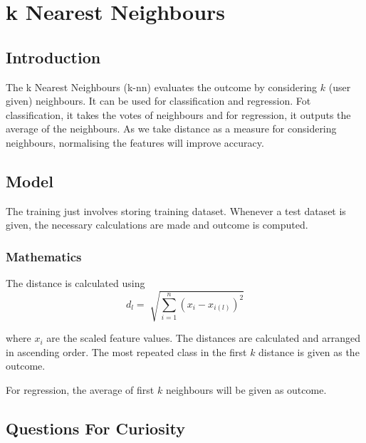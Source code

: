 
\chapter{k Nearest Neighbours}
\label{chp:knn}

\section{Introduction}

The k Nearest Neighbours (k-nn) evaluates the outcome by considering
$k$ (user given) neighbours. It can be used for classification and regression.
Fot classification, it takes the votes of neighbours and for regression, it outputs
the average of the neighbours. As we take distance as a measure for considering neighbours,
normalising the features will improve accuracy.

\section{Model}

The training just involves storing training dataset. Whenever a test dataset is given,
the necessary calculations are made and outcome is computed.

\subsection{Mathematics}
The distance is calculated using
\begin{equation}
    d_{l} = \sqrt[]{\sum_{i=1}^{n}(x_i-x_{i(l)})^2}
\end{equation}

where $x_i$ are the scaled feature values.
The distances are calculated and arranged in ascending order. The most repeated
class in the first $k$ distance is given as the outcome.

For regression, the average of first $k$ neighbours will be given as outcome.

\section{Questions For Curiosity}